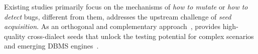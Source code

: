 \documentclass[sigconf,review,anonymous]{acmart}
\begin{document}



Existing studies primarily focus on the mechanisms of \textit{how to mutate} or \textit{how to detect} bugs, different from them, \tool{} addresses the upstream challenge of \textit{seed acquisition}. As an orthogonal and complementary approach~\cite{zhong2020squirrel, jiang2023dynsql}, \tool{} provides high-quality cross-dialect seeds that unlock the testing potential for complex scenarios and emerging DBMS engines~\cite{gao2023comprehensive}.
\end{document}
